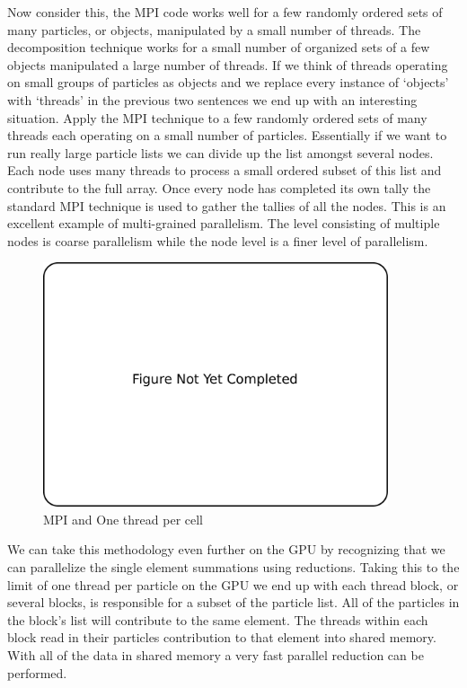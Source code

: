 Now consider this, the MPI code works well for a few randomly ordered sets of many particles, or objects, manipulated by a small number of threads. The decomposition technique works for a small number of organized sets of a few objects manipulated a large number of threads. If we think of threads operating on small groups of particles as objects and we replace every instance of `objects' with `threads' in the previous two sentences we end up with an interesting situation. Apply the MPI technique to a few randomly ordered sets of many threads each operating on a small number of particles. Essentially if we want to run really large particle lists we can divide up the list amongst several nodes. Each node uses many threads to process a small ordered subset of this list and contribute to the full array. Once every node has completed its own tally the standard MPI technique is used to gather the tallies of all the nodes. This is an excellent example of multi-grained parallelism. The level consisting of multiple nodes is coarse parallelism while the node level is a finer level of parallelism.   

\begin{figure}
\begin{center}
\includegraphics[width=4in]{introduction/not_finished.pdf}
\end{center}
\caption{MPI and One thread per cell}
\label{fig:pic_flowchart_parallel}
\end{figure}

We can take this methodology even further on the GPU by recognizing that we can parallelize the single element summations using reductions. Taking this to the limit of one thread per particle on the GPU we end up with each thread block, or several blocks, is responsible for a subset of the particle list. All of the particles in the block's list will contribute to the same element. The threads within each block read in their particles contribution to that element into shared memory. With all of the data in shared memory a very fast parallel reduction can be performed.

